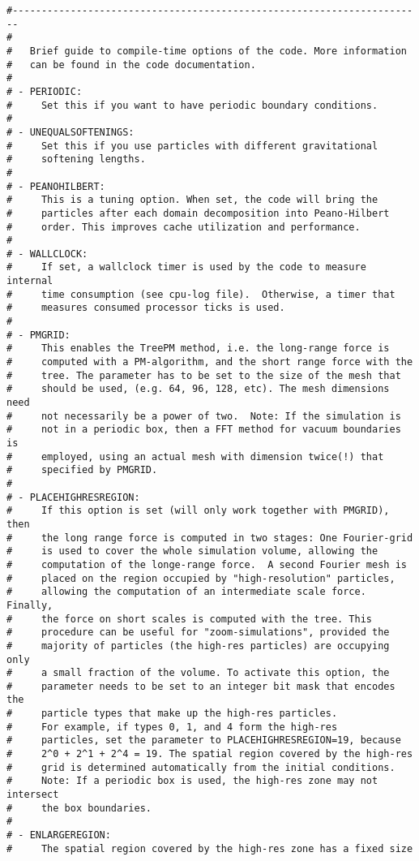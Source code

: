 \documentclass[a4paper,english,10.5pt]{scrartcl}
\begin{document}
\begin{verbatim}
#-----------------------------------------------------------------------
#
#   Brief guide to compile-time options of the code. More information
#   can be found in the code documentation.
#
# - PERIODIC:   
#     Set this if you want to have periodic boundary conditions.
#
# - UNEQUALSOFTENINGS:
#     Set this if you use particles with different gravitational
#     softening lengths.
#
# - PEANOHILBERT:    
#     This is a tuning option. When set, the code will bring the
#     particles after each domain decomposition into Peano-Hilbert
#     order. This improves cache utilization and performance.
#  
# - WALLCLOCK:       
#     If set, a wallclock timer is used by the code to measure internal
#     time consumption (see cpu-log file).  Otherwise, a timer that
#     measures consumed processor ticks is used.
#
# - PMGRID:     
#     This enables the TreePM method, i.e. the long-range force is
#     computed with a PM-algorithm, and the short range force with the
#     tree. The parameter has to be set to the size of the mesh that
#     should be used, (e.g. 64, 96, 128, etc). The mesh dimensions need
#     not necessarily be a power of two.  Note: If the simulation is
#     not in a periodic box, then a FFT method for vacuum boundaries is
#     employed, using an actual mesh with dimension twice(!) that
#     specified by PMGRID.
#
# - PLACEHIGHRESREGION: 
#     If this option is set (will only work together with PMGRID), then
#     the long range force is computed in two stages: One Fourier-grid
#     is used to cover the whole simulation volume, allowing the
#     computation of the longe-range force.  A second Fourier mesh is
#     placed on the region occupied by "high-resolution" particles,
#     allowing the computation of an intermediate scale force. Finally,
#     the force on short scales is computed with the tree. This
#     procedure can be useful for "zoom-simulations", provided the
#     majority of particles (the high-res particles) are occupying only
#     a small fraction of the volume. To activate this option, the
#     parameter needs to be set to an integer bit mask that encodes the
#     particle types that make up the high-res particles.
#     For example, if types 0, 1, and 4 form the high-res
#     particles, set the parameter to PLACEHIGHRESREGION=19, because
#     2^0 + 2^1 + 2^4 = 19. The spatial region covered by the high-res 
#     grid is determined automatically from the initial conditions. 
#     Note: If a periodic box is used, the high-res zone may not intersect
#     the box boundaries.
#
# - ENLARGEREGION: 
#     The spatial region covered by the high-res zone has a fixed size

\end{verbatim}
\end{document}
